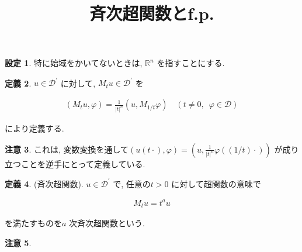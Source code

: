 \documentclass[10pt, fleqn, label-section=none]{bxjsarticle}
\title{斉次超関数とf.p.}
\date{}
\author{}
\theoremstyle{definition}
\newtheorem{dfn}{定義}[section]
\newtheorem{setting}[dfn]{設定}
\newtheorem{remark}[dfn]{注意}
\newcommand{\abs}[1]{\left|#1\right|}
\renewcommand{\;}{\, ; \,}
\begin{document}
\maketitle

\section{}
\subsection{}

\begin{setting}特に始域をかいてないときは, $\mathbb R^n$ を指すことにする. 

\end{setting}

\begin{dfn}$u \in \mathcal D^\prime $ に対して, $M_t u \in \mathcal D^\prime $ を

\begin{align*} (M_tu, \varphi) = \frac{1}{\abs t^n} (u, M_{1/t} \varphi) \quad (t \neq 0, \,\,\, \varphi \in \mathcal D)  \end{align*}

により定義する. 

\end{dfn}

\begin{remark}これは, 変数変換を通して$(u(t \cdot ), \varphi) = (u, \frac{1}{\abs t^n}  \varphi ((1/t)\cdot)  )$ が成り立つことを逆手にとって定義している. 

\end{remark}

\begin{dfn}(斉次超関数). $u \in \mathcal D^\prime$ で, 任意の$t > 0$ に対して超関数の意味で

\begin{align*} M_t u = t^a u\end{align*}

を満たすものを$a$ 次斉次超関数という. 

\end{dfn}

\begin{remark}

\end{remark}
\end{document}

